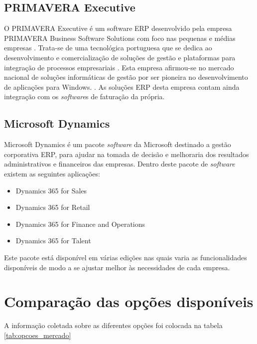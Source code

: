 \subsection{PRIMAVERA Executive}
O PRIMAVERA Executive é um software ERP desenvolvido pela empresa PRIMAVERA Business Software Solutions com foco nas pequenas e médias empresas \cite{PRIMAVERABSS}. Trata-se de uma tecnológica portuguesa que se dedica ao desenvolvimento e comercialização de soluções de gestão e plataformas para integração de processos empresariais \cite{Wikipediaa}. Esta empresa afirmou-se no mercado nacional de soluções informáticas de gestão por ser pioneira no desenvolvimento de aplicações para Windows. \cite{Wikipediaa}.
As soluções ERP desta empresa contam ainda integração com os \textit{software}s de faturação da própria.

\subsection{Microsoft Dynamics}
Microsoft Dynamics é um pacote \textit{software} da Microsoft destinado a gestão corporativa ERP, para ajudar na tomada de decisão e melhoraria dos resultados administrativos e financeiros das empresas\cite{Wikipediac}.
Dentro deste pacote de \textit{software} existem as seguintes aplicações:
\begin{itemize}
	\item Dynamics 365 for Sales
	\item Dynamics 365 for Retail
	\item Dynamics 365 for Finance and Operations
	\item Dynamics 365 for Talent
\end{itemize}
Este pacote está disponível em várias edições nas quais varia as funcionalidades disponíveis de modo a se ajustar melhor às necessidades de cada empresa.

\newpage

\section{Comparação das opções disponíveis}
A informação coletada sobre as diferentes opções foi colocada na tabela \ref{tab:opcoes_mercado}

